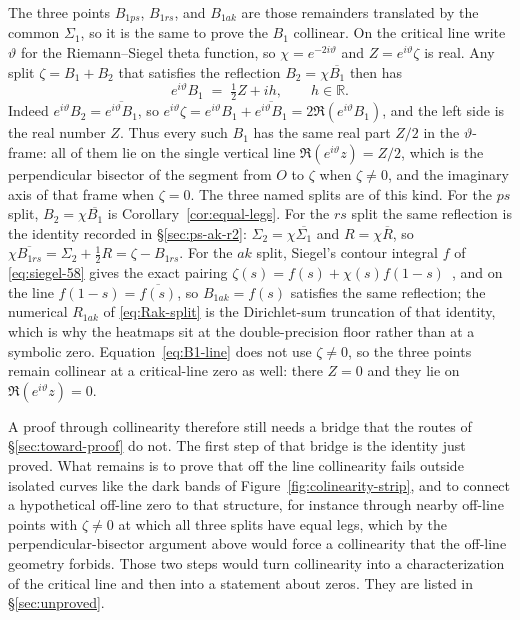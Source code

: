 \documentclass[11pt]{article}
\theoremstyle{definition}
\begin{document}
The three points $B_{1ps}$, $B_{1rs}$, and $B_{1ak}$ are those remainders
translated by the common $\Sigma_1$, so it is the same to prove the $B_1$
collinear. On the critical line write $\vartheta$ for the Riemann--Siegel
theta function, so $\chi=e^{-2i\vartheta}$ and $Z=e^{i\vartheta}\zeta$ is
real. Any split $\zeta=B_1+B_2$ that satisfies the reflection
$B_2=\chi\overline{B_1}$ then has
\begin{equation}\label{eq:B1-line}
e^{i\vartheta}B_1
\;=\;
\tfrac12 Z+ih,
\qquad h\in\mathbb R.
\end{equation}
Indeed $e^{i\vartheta}B_2=\overline{e^{i\vartheta}B_1}$, so
$e^{i\vartheta}\zeta=e^{i\vartheta}B_1+\overline{e^{i\vartheta}B_1}
=2\Re(e^{i\vartheta}B_1)$, and the left side is the real number $Z$.
Thus every such $B_1$ has the same real part $Z/2$ in the $\vartheta$-frame:
all of them lie on the single vertical line $\Re(e^{i\vartheta}z)=Z/2$,
which is the perpendicular bisector of the segment from $O$ to $\zeta$ when
$\zeta\neq0$, and the imaginary axis of that frame when $\zeta=0$.
The three named splits are of this kind. For the $ps$ split,
$B_2=\chi\overline{B_1}$ is Corollary~\ref{cor:equal-legs}. For the $rs$
split the same reflection is the identity recorded in
\S\ref{sec:ps-ak-r2}: $\Sigma_2=\chi\overline{\Sigma_1}$ and
$R=\chi\overline{R}$, so
$\chi\overline{B_{1rs}}=\Sigma_2+\tfrac12 R=\zeta-B_{1rs}$.
For the $ak$ split, Siegel's contour integral $f$ of
\eqref{eq:siegel-58} gives the exact pairing
$\zeta(s)=f(s)+\chi(s)f(1-s)$~\cite{Siegel1932}, and on the line
$f(1-s)=\overline{f(s)}$, so $B_{1ak}=f(s)$ satisfies the same
reflection; the numerical $R_{1ak}$ of \eqref{eq:Rak-split} is the
Dirichlet-sum truncation of that identity, which is why the heatmaps
sit at the double-precision floor rather than at a symbolic zero.
Equation~\eqref{eq:B1-line} does not use $\zeta\neq0$, so the three
points remain collinear at a critical-line zero as well: there $Z=0$ and
they lie on $\Re(e^{i\vartheta}z)=0$.

A proof through collinearity therefore still needs a bridge that the routes of
\S\ref{sec:toward-proof} do not. The first step of that bridge is the
identity just proved. What remains is to prove that off the line
collinearity fails outside isolated curves like the dark bands of
Figure~\ref{fig:colinearity-strip}, and to connect a hypothetical
off-line zero to that structure, for instance through nearby off-line
points with $\zeta\neq0$ at which all three splits have equal legs, which
by the perpendicular-bisector argument above would force a collinearity
that the off-line geometry forbids. Those two steps would turn
collinearity into a characterization of the critical line and then into
a statement about zeros. They are listed in \S\ref{sec:unproved}.
\end{document}
